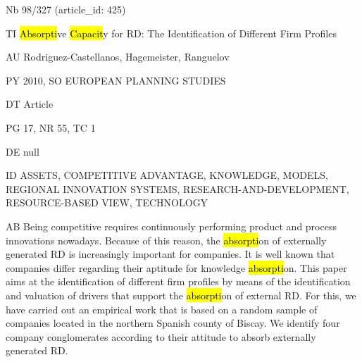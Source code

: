 \documentclass[a4paper]{article}
\begin{document}
\vspace*{-2cm}
Nb \tabto{0cm}98/327 (article\_id: 425)\par
TI \tabto{0cm}\hl{Absorpti}ve \hl{Capacit}y for RD: The Identification of Different Firm Profiles\par
AU \tabto{0cm}Rodriguez-Castellanos, Hagemeister, Ranguelov\par
PY \tabto{0cm}2010, SO EUROPEAN PLANNING STUDIES\par
DT \tabto{0cm}Article\par
PG \tabto{0cm}17, NR 55, TC 1\par
DE \tabto{0cm}null\par
ID \tabto{0cm}ASSETS, COMPETITIVE ADVANTAGE, KNOWLEDGE, MODELS, REGIONAL INNOVATION SYSTEMS, RESEARCH-AND-DEVELOPMENT, RESOURCE-BASED VIEW, TECHNOLOGY\par
AB \tabto{0cm}Being competitive requires continuously performing product and process innovations nowadays. Because of this reason, the \hl{absorpti}on of externally generated RD is increasingly important for companies. It is well known that companies differ regarding their aptitude for knowledge \hl{absorpti}on. This paper aims at the identification of different firm profiles by means of the identification and valuation of drivers that support the \hl{absorpti}on of external RD. For this, we have carried out an empirical work that is based on a random sample of companies located in the northern Spanish county of Biscay. We identify four company conglomerates according to their attitude to absorb externally generated RD.\par
\clearpage
\end{document}

